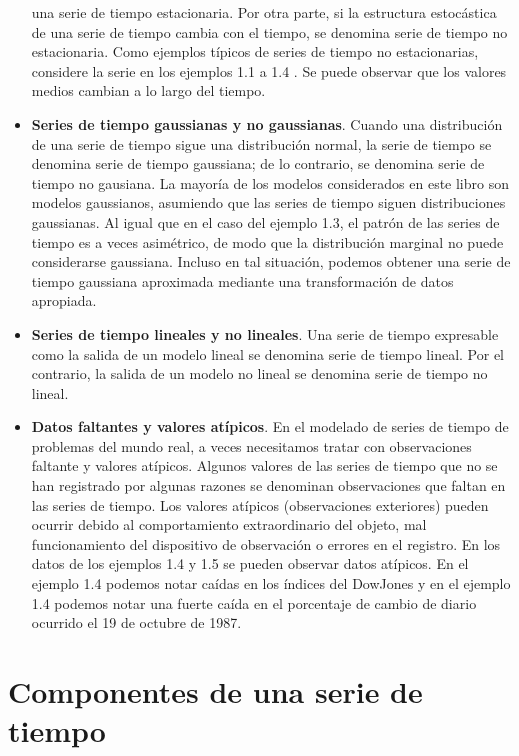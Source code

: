 \documentclass[12pt,]{krantz}
\theoremstyle{definition}
\theoremstyle{definition}
\theoremstyle{definition}
\theoremstyle{remark}
\begin{document}
\begin{itemize}
  una serie de tiempo estacionaria. Por otra parte, si la estructura
  estocástica de una serie de tiempo cambia con el tiempo, se denomina
  serie de tiempo no estacionaria. Como ejemplos típicos de series de
  tiempo no estacionarias, considere la serie en los ejemplos 1.1 a 1.4
  . Se puede observar que los valores medios cambian a lo largo del
  tiempo.
\item
  \textbf{Series de tiempo gaussianas y no gaussianas}. Cuando una
  distribución de una serie de tiempo sigue una distribución normal, la
  serie de tiempo se denomina serie de tiempo gaussiana; de lo
  contrario, se denomina serie de tiempo no gausiana. La mayoría de los
  modelos considerados en este libro son modelos gaussianos, asumiendo
  que las series de tiempo siguen distribuciones gaussianas. Al igual
  que en el caso del ejemplo 1.3, el patrón de las series de tiempo es a
  veces asimétrico, de modo que la distribución marginal no puede
  considerarse gaussiana. Incluso en tal situación, podemos obtener una
  serie de tiempo gaussiana aproximada mediante una transformación de
  datos apropiada.
\item
  \textbf{Series de tiempo lineales y no lineales}. Una serie de tiempo
  expresable como la salida de un modelo lineal se denomina serie de
  tiempo lineal. Por el contrario, la salida de un modelo no lineal se
  denomina serie de tiempo no lineal.
\item
  \textbf{Datos faltantes y valores atípicos}. En el modelado de series
  de tiempo de problemas del mundo real, a veces necesitamos tratar con
  observaciones faltante y valores atípicos. Algunos valores de las
  series de tiempo que no se han registrado por algunas razones se
  denominan observaciones que faltan en las series de tiempo. Los
  valores atípicos (observaciones exteriores) pueden ocurrir debido al
  comportamiento extraordinario del objeto, mal funcionamiento del
  dispositivo de observación o errores en el registro. En los datos de
  los ejemplos 1.4 y 1.5 se pueden observar datos atípicos. En el
  ejemplo 1.4 podemos notar caídas en los índices del DowJones y en el
  ejemplo 1.4 podemos notar una fuerte caída en el porcentaje de cambio
  de diario ocurrido el 19 de octubre de 1987.
\end{itemize}

\section{Componentes de una serie de
tiempo}\label{componentes-de-una-serie-de-tiempo}
\end{document}
